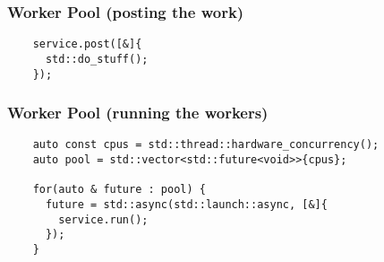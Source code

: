 \begin{frame}[fragile]
  \frametitle{Worker Pool (posting the work)}
  \begin{verbatim}
    service.post([&]{
      std::do_stuff();
    });
  \end{verbatim}
\end{frame}

\begin{frame}[fragile]
  \frametitle{Worker Pool (running the workers)}
  \begin{verbatim}
    auto const cpus = std::thread::hardware_concurrency();
    auto pool = std::vector<std::future<void>>{cpus};

    for(auto & future : pool) {
      future = std::async(std::launch::async, [&]{
        service.run();
      });
    }
  \end{verbatim}
\end{frame}
